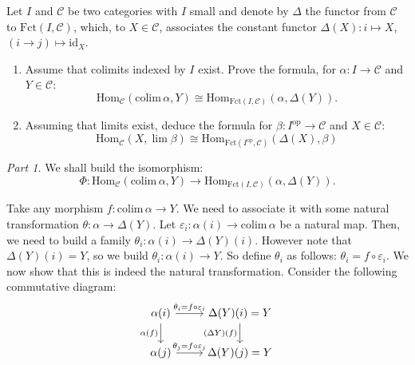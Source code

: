 \documentclass{category-template}
\begin{document}
\begin{problem}
    Let $I$ and $\mathcal{C}$ be two categories with $I$ small and denote by
$\Delta$ the functor from $\mathcal{C}$ to $\text{Fct}(I, \mathcal{C})$, which,
to $X \in \mathcal{C}$, associates the constant functor $\Delta (X): i \mapsto X$,
$(i \to j) \mapsto \text{id}_X$.
\begin{enumerate}
    \item Assume that colimits indexed by $I$ exist. Prove the formula, for
    $\alpha: I \to \mathcal{C}$ and $Y \in \mathcal{C}$:
    \begin{equation*}
        \text{Hom}_{\mathcal{C}}(\text{colim}\,\alpha, Y) \cong \text{Hom}_{\text{Fct}(I,\mathcal{C})}(\alpha,\Delta(Y)).
    \end{equation*}
    \item Assuming that limits exist, deduce the formula for $\beta:
    I^{\text{op}} \to \mathcal{C}$ and $X \in \mathcal{C}$:
    \begin{equation*}
        \text{Hom}_{\mathcal{C}}(X,\lim \beta) \cong \text{Hom}_{\text{Fct}(I^{\text{op}}, \mathcal{C})}(\Delta(X), \beta)
    \end{equation*}
\end{enumerate}
\end{problem}

\textit{Part 1.} We shall build the isomorphism:
\begin{equation*}
    \Phi: \text{Hom}_{\mathcal{C}}(\text{colim}\,\alpha, Y) \to \text{Hom}_{\text{Fct}(I,\mathcal{C})}(\alpha,\Delta(Y)).
\end{equation*}

Take any morphism $f: \text{colim}\,\alpha \to Y$. We need to associate it
with some natural transformation $\theta: \alpha \to \Delta(Y)$. Let
$\varepsilon_i: \alpha(i) \to \text{colim}\,\alpha$ be a natural map. Then,
we need to build a family $\theta_i: \alpha(i) \to \Delta(Y)(i)$. However note
that $\Delta(Y)(i)=Y$, so we build $\theta_i: \alpha(i) \to Y$. So define
$\theta_i$ as follows: $\theta_i = f \circ \varepsilon_i$. We now show that 
this is indeed the natural transformation. Consider the following commutative 
diagram:
\[\begin{tikzcd}
\alpha(i) \arrow{r}{\theta_i=f \circ \varepsilon_i} \arrow[swap]{d}{\alpha(f)} & \Delta(Y)(i)=Y \arrow[swap]{d}{(\Delta Y)(f)} \\
\alpha(j) \arrow{r}{\theta_j=f \circ \varepsilon_j} & \Delta(Y)(j)=Y
\end{tikzcd}
\]
\end{document}
